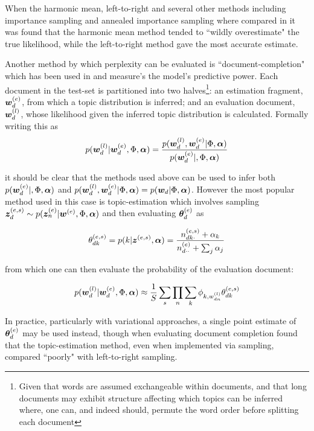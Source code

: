 When the harmonic mean, left-to-right and several other methods including importance sampling and annealed importance sampling where compared in \cite{Wallach2009} it was found that the harmonic mean method tended to ``wildly overestimate" the true likelihood, while the left-to-right method gave the most accurate estimate.

Another method by which perplexity can be evaluated is ``document-completion" which has been used in \cite{Virtanen2012a}\cite{Asuncion2012}\cite{RosenZvi2004} and measure's the model's predictive power. Each document in the test-set is partitioned into two halves\footnote{Given that words are assumed exchangeable within documents, and that long documents may exhibit structure affecting which topics can be inferred where, one can, and indeed should, permute the word order before splitting each document}: an estimation fragment, $\bm w_d^{(e)}$, from which a topic distribution is inferred; and an evaluation document, $\bm w_d^{(l)}$, whose likelihood given the inferred topic distribution is calculated. Formally writing this as
\begin{align}
p(\bm w_d^{(l)}|\bm w_d^{(e)}, \Phi, \bm \alpha) = \frac{p(\bm w_d^{(l)},\bm w_d^{(e)} |\Phi, \bm \alpha)}{p(\bm w_d^{(e)}|, \Phi, \bm \alpha)}
\end{align}

it should be clear that the methods used above can be used to infer both $p(\bm w_d^{(e)}|, \Phi, \bm \alpha)$ and $p(\bm w_d^{(l)},\bm w_d^{(e)} | \Phi, \bm \alpha) = p(\bm w_d | \Phi, \bm \alpha)$. However the most  popular method used in this case is topic-estimation which involves sampling $\bm z_d^{(e,s)} \sim p(\bm z_n^{(e)} | \bm w^{(e)}, \Phi, \bm \alpha)$ and then evaluating $\bm \theta_d^{(e)}$ as

\begin{align}
\theta^{(e,s)}_{dk} = p(k | \bm z^{(e,s)}, \bm \alpha) = \frac{n^{(e,s)}_{dk\cdot} + \alpha_k}{n^{(e)}_{d\cdot\cdot} + \sum_j \alpha_j}
\end{align}

from which one can then evaluate the probability of the evaluation document:

\begin{align}
p(\bm w_d^{(l)}|\bm w_d^{(e)}, \Phi, \bm \alpha) \approx
\frac{1}{ {S} } \sum_s \prod_n \sum_k \phi_{k,w^{(l)}_{dn}}\theta_{dk}^{(e,s)}
\end{align}

In practice, particularly with variational approaches, a single point estimate of $\bm \theta_d^{(e)}$ may be used instead\cite{Asuncion2012}, though when evaluating document completion \cite{Wallach2009} found that the topic-estimation method, even when implemented via sampling, compared ``poorly" with left-to-right sampling. 


